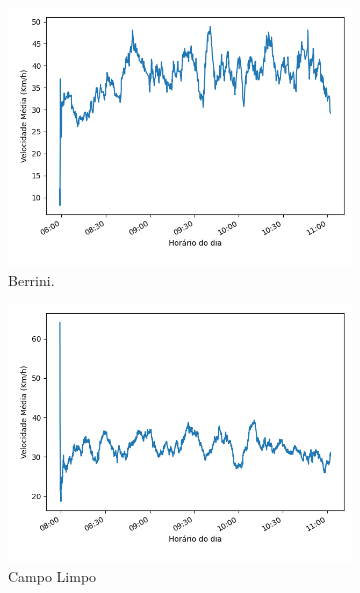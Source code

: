 \begin{figure}
\centering
\begin{subfigure}{.5\textwidth}
  \centering
  \includegraphics[width=\textwidth]{figuras/detect_graphics/avg_speed_7-dez-su-corr_Berrini.png}
  \caption{Berrini.}
  \label{fig:avg_speed_Berrini}
\end{subfigure}%
\begin{subfigure}{.5\textwidth}
  \centering
  \includegraphics[width=\textwidth]{figuras/detect_graphics/avg_speed_7-dez-su-corr_CampoLimpo.png}
  \caption{Campo Limpo}
  \label{fig:avg_speed_Campo Limpo}
\end{subfigure}
\centering
\begin{subfigure}{.5\textwidth}

\end{subfigure}
\end{figure}
